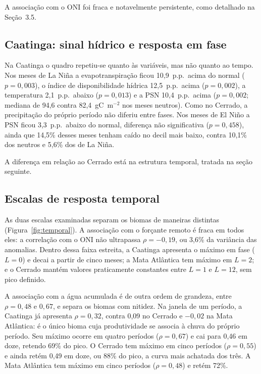 \documentclass[a4paper,fleqn]{cas-sc}
\begin{document}
A associação com o ONI foi fraca e notavelmente persistente, como detalhado na Seção~3.5.

\subsection{Caatinga: sinal hídrico e resposta em fase}

Na Caatinga o quadro repetiu-se quanto às variáveis, mas não quanto ao tempo. Nos meses de La Niña a evapotranspiração ficou 10,9~p.p.\ acima do normal ($p = 0{,}003$), o índice de disponibilidade hídrica 12,5~p.p.\ acima ($p = 0{,}002$), a temperatura 2,1~p.p.\ abaixo ($p = 0{,}013$) e a PSN 10,4~p.p.\ acima ($p = 0{,}002$; mediana de 94,6 contra 82,4~gC~m$^{-2}$ nos meses neutros). Como no Cerrado, a precipitação do próprio período não diferiu entre fases. Nos meses de El Niño a PSN ficou 3,3~p.p.\ abaixo do normal, diferença não significativa ($p = 0{,}458$), ainda que 14,5\% desses meses tenham caído no decil mais baixo, contra 10,1\% dos neutros e 5,6\% dos de La Niña.

A diferença em relação ao Cerrado está na estrutura temporal, tratada na seção seguinte.

\subsection{Escalas de resposta temporal}

As duas escalas examinadas separam os biomas de maneiras distintas (Figura~\ref{fig:temporal}). A associação com o forçante remoto é fraca em todos eles: a correlação com o ONI não ultrapassa $\rho = -0{,}19$, ou 3,6\% da variância das anomalias. Dentro dessa faixa estreita, a Caatinga apresenta o máximo em fase ($L = 0$) e decai a partir de cinco meses; a Mata Atlântica tem máximo em $L = 2$; e o Cerrado mantém valores praticamente constantes entre $L = 1$ e $L = 12$, sem pico definido.

A associação com a água acumulada é de outra ordem de grandeza, entre $\rho = 0{,}48$ e $0{,}67$, e separa os biomas com nitidez. Na janela de um período, a Caatinga já apresenta $\rho = 0{,}32$, contra 0,09 no Cerrado e $-0{,}02$ na Mata Atlântica: é o único bioma cuja produtividade se associa à chuva do próprio período. Seu máximo ocorre em quatro períodos ($\rho = 0{,}67$) e cai para 0,46 em doze, retendo 69\% do pico. O Cerrado tem máximo em cinco períodos ($\rho = 0{,}55$) e ainda retém 0,49 em doze, ou 88\% do pico, a curva mais achatada dos três. A Mata Atlântica tem máximo em cinco períodos ($\rho = 0{,}48$) e retém 72\%.
\end{document}
